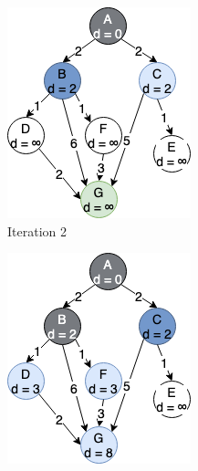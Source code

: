 \begin{figure}[h!]
\begin{subfigure}[b]{0.2\linewidth}
    \includegraphics[width=\linewidth]{images/dijkstra_expansion2.png}
     \caption{Iteration 2}
  \end{subfigure}
  \hfill
  \begin{subfigure}[b]{0.2\linewidth}
    \includegraphics[width=\linewidth]{images/dijkstra_expansion3.png}

\end{subfigure}
\end{figure}
